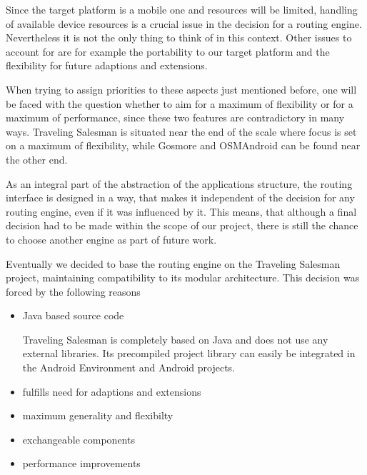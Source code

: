 Since the target platform is a mobile one and resources will be limited, handling of available device resources is a crucial issue in the decision for a routing engine. Nevertheless it is not the only thing to think of in this context. Other issues to account for are for example the portability to our target platform and the flexibility for future adaptions and extensions.\newline

When trying to assign priorities to these aspects just mentioned before, one will be faced with the question whether to aim for a maximum of flexibility or for a maximum of performance, since these two features are contradictory in many ways. Traveling Salesman is situated near the end of the scale where focus is set on a maximum of flexibility, while Gosmore and OSMAndroid can be found near the other end.\newline

As an integral part of the abstraction of the applications structure, the routing interface is designed in a way, that makes it independent of the decision for any routing engine, even if it was influenced by it. This means, that although a final decision had to be made within the scope of our project, there is still the chance to choose another engine as part of future work.\newline

Eventually we decided to base the routing engine on the Traveling Salesman project, maintaining compatibility to its modular architecture. This decision was forced by the following reasons

\begin{itemize}
	\item Java based source code
	
		Traveling Salesman is completely based on Java and does not use any external libraries. Its precompiled project library can easily be integrated in the Android Environment and Android projects.
	
	\item fulfills need for adaptions and extensions
	
	\item maximum generality and flexibilty
	
	\item exchangeable components
	
	\item performance improvements 
	
\end{itemize}

